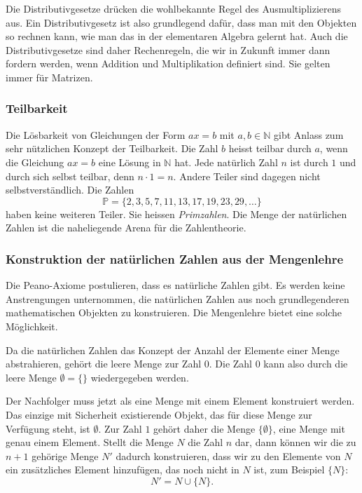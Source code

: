 Die Distributivgesetze drücken die wohlbekannte Regel des
Ausmultiplizierens aus.
Ein Distributivgesetz ist also grundlegend dafür, dass man mit den
Objekten so rechnen kann, wie man das in der elementaren Algebra 
gelernt hat.
Auch die Distributivgesetze sind daher Rechenregeln, die wir in
Zukunft immer dann fordern werden, wenn Addition und Multiplikation
definiert sind.
Sie gelten immer für Matrizen.

\subsubsection{Teilbarkeit}
Die Lösbarkeit von Gleichungen der Form $ax=b$ mit $a,b\in\mathbb{N}$
gibt Anlass zum sehr nützlichen Konzept der Teilbarkeit.
%
Die Zahl $b$ heisst teilbar durch $a$, wenn die Gleichung $ax=b$ eine
Lösung in $\mathbb{N}$ hat.
%
Jede natürlich Zahl $n$ ist durch $1$ und durch sich selbst teilbar,
denn $n\cdot 1 = n$.
Andere Teiler sind dagegen nicht selbstverständlich.
Die Zahlen
\[
\mathbb{P}
=
\{2,3,5,7,11,13,17,19,23,29,\dots\}
\]
haben keine weiteren Teiler. Sie heissen {\em Primzahlen}.
%
Die Menge der natürlichen Zahlen ist die naheliegende Arena
für die Zahlentheorie.
%

\subsubsection{Konstruktion der natürlichen Zahlen aus der Mengenlehre}
Die Peano-Axiome postulieren, dass es natürliche Zahlen gibt.
Es werden keine Anstrengungen unternommen, die natürlichen Zahlen
aus noch grundlegenderen mathematischen Objekten zu konstruieren.
Die Mengenlehre bietet eine solche Möglichkeit.

Da die natürlichen Zahlen das Konzept der Anzahl der Elemente einer
Menge abstrahieren, gehört die leere Menge zur Zahl $0$.
Die Zahl $0$ kann also durch die leere Menge $\emptyset = \{\}$
wiedergegeben werden.

Der Nachfolger muss jetzt als eine Menge mit einem Element konstruiert
werden.
Das einzige mit Sicherheit existierende Objekt, das für diese Menge
zur Verfügung steht, ist $\emptyset$.
Zur Zahl $1$ gehört daher die Menge $\{\emptyset\}$, eine Menge mit
genau einem Element.
Stellt die Menge $N$ die Zahl $n$ dar, dann können wir die zu $n+1$
gehörige Menge $N'$ dadurch konstruieren, dass wir zu den Elemente
von $N$ ein zusätzliches Element hinzufügen, das noch nicht in $N$ ist,
zum Beispiel $\{N\}$:
\[
N' = N \cup \{ N \}.
\]

